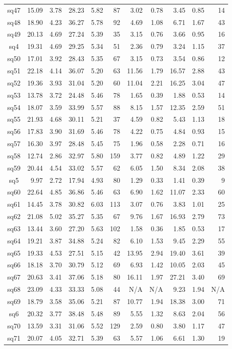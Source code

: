 {\begin{longtable}{@{}cr@{\hspace{1em}}r@{\hspace{1em}}r@{\hspace{1em}}r@{\hspace{1em}}r@{\hspace{2em}}r@{\hspace{1em}}r@{\hspace{1em}}r@{\hspace{1em}}r@{\hspace{1em}}r@{}}
sq47&15.09&3.78&28.23&5.82&87&3.02&0.78&3.45&0.85&14\\
sq48&18.90&4.23&36.27&5.78&92&4.69&1.08&6.71&1.67&43\\
sq49&20.13&4.69&27.24&5.39&35&3.15&0.76&3.66&0.95&16\\
sq4&19.31&4.69&29.25&5.34&51&2.36&0.79&3.24&1.15&37\\
sq50&17.01&3.92&28.43&5.35&67&3.15&0.73&3.54&0.86&12\\
sq51&22.18&4.14&36.07&5.20&63&11.56&1.79&16.57&2.88&43\\
sq52&19.36&3.93&31.04&5.20&60&11.04&2.21&16.25&3.04&47\\
sq53&13.78&3.72&24.48&5.46&78&1.65&0.39&1.88&0.53&14\\
sq54&18.07&3.59&33.99&5.57&88&8.15&1.57&12.35&2.59&51\\
sq55&21.93&4.68&30.11&5.21&37&4.59&0.82&5.43&1.13&18\\
sq56&17.83&3.90&31.69&5.46&78&4.22&0.75&4.84&0.93&15\\
sq57&16.30&3.97&28.48&5.45&75&1.96&0.58&2.28&0.71&16\\
sq58&12.74&2.86&32.97&5.80&159&3.77&0.82&4.89&1.22&29\\
sq59&20.44&4.54&33.02&5.57&62&6.05&1.50&8.34&2.08&38\\
sq5&9.97&2.72&17.94&4.93&80&1.29&0.33&1.41&0.39& 9\\
sq60&22.64&4.85&36.86&5.46&63&6.90&1.62&11.07&2.33&60\\
sq61&14.45&3.78&30.82&6.03&113&3.07&0.76&3.83&1.01&25\\
sq62&21.08&5.02&35.27&5.35&67&9.76&1.67&16.93&2.79&73\\
sq63&13.44&3.60&27.20&5.63&102&1.58&0.36&1.85&0.53&17\\
sq64&19.21&3.87&34.88&5.24&82&6.10&1.53&9.45&2.29&55\\
sq65&19.33&4.53&27.51&5.15&42&13.95&2.94&19.40&3.61&39\\
sq66&18.18&3.70&30.79&5.12&69&6.93&1.42&10.05&2.03&45\\
sq67&20.63&3.41&37.06&5.18&80&16.11&1.97&27.21&3.40&69\\
sq68&23.09&4.33&33.33&5.08&44&N/A&N/A&9.23&1.94&N/A\\
sq69&18.79&3.58&35.06&5.21&87&10.77&1.94&18.38&3.00&71\\
sq6&20.32&3.77&38.48&5.48&89&5.55&1.32&8.63&2.04&56\\
sq70&13.59&3.31&31.06&5.52&129&2.59&0.80&3.80&1.17&47\\
sq71&20.07&4.05&32.71&5.39&63&5.57&1.06&6.61&1.30&19\\

\end{longtable}}
